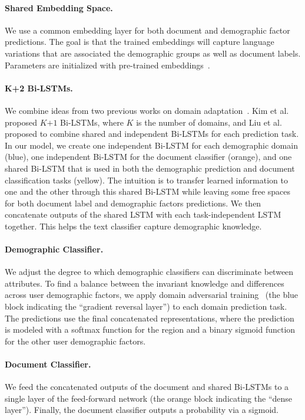 \paragraph{Shared Embedding Space.} 
We use a common embedding layer for both document and demographic factor predictions. The goal is that the trained embeddings will capture language variations that are associated the demographic groups as well as document labels. Parameters are initialized with pre-trained embeddings~\cite{mikolov2013distributed, pennington2014glove}.

\paragraph{K+2 Bi-LSTMs.} 
We combine ideas from two previous works on domain adaptation~\cite{liu2017adversarial, kim2017domain}. Kim et al.~\cite{kim2017domain} proposed $K$$+$$1$ Bi-LSTMs, where $K$ is the number of domains, and Liu et al.~\cite{liu2017adversarial} proposed to combine shared and independent Bi-LSTMs for each prediction task. In our model, we create one independent Bi-LSTM for each demographic domain (blue), one independent Bi-LSTM for the document classifier (orange), and one shared Bi-LSTM that is used in both the demographic prediction and document classification tasks (yellow). The intuition is to transfer learned information to one and the other through this shared Bi-LSTM while leaving some free spaces for both document label and demographic factors predictions. We then concatenate outputs of the shared LSTM with each task-independent LSTM together. This helps the text classifier capture demographic knowledge.

\paragraph{Demographic Classifier.} 
We adjust the degree to which demographic classifiers can discriminate between attributes. 
To find a balance between the invariant knowledge and differences across user demographic factors, we apply domain adversarial training~\cite{ganin2016domain} (the blue block indicating the ``gradient reversal layer'') to each domain prediction task. The predictions use the final concatenated representations, where the prediction is modeled with a {softmax} function for the region and a binary {sigmoid} function for the other user demographic factors. 

\paragraph{Document Classifier.} 
We feed the concatenated outputs of the document and shared Bi-LSTMs to a single layer of the feed-forward network (the orange block indicating the ``dense layer''). Finally, the document classifier outputs a probability via a sigmoid.

